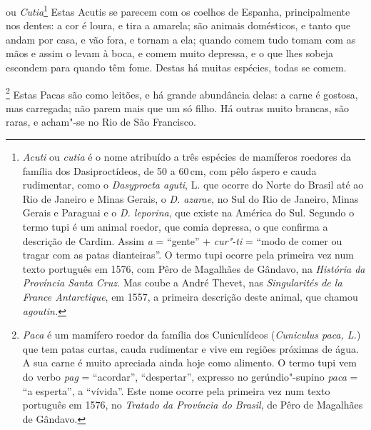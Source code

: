  ou \textit{Cutia}\footnote{ \textit{Acuti} ou
\textit{cutia} é o nome atribuído a três espécies de mamíferos
roedores da família dos Dasiproctídeos, de 50 a 60\,cm, com pêlo áspero e
cauda rudimentar, como o \textit{Dasyprocta aguti}, L. que ocorre do
Norte do Brasil até ao Rio de Janeiro e Minas Gerais, o \textit{D.
azarae}, no Sul do Rio de Janeiro, Minas Gerais e Paraguai e o
\textit{D. leporina}, que existe na América do Sul. Segundo o
termo tupi é um animal roedor, que comia depressa, o que confirma a
descrição de Cardim. Assim \textit{a} = ``gente'' + \textit{cur"-ti} = 
``modo de comer ou tragar com as patas dianteiras''. O termo tupi ocorre
pela primeira vez num texto português em 1576, com Pêro de Magalhães de
Gândavo, na \textit{História da Província Santa Cruz.} Mas coube a
André Thevet, nas \textit{Singularités de la France Antarctique}, em
1557, a primeira descrição deste animal, que chamou
\textit{agoutin.}} Estas Acutis se parecem com os coelhos de
Espanha, principalmente nos dentes: a cor é loura, e tira a amarela;
são animais domésticos, e tanto que andam por casa, e vão fora, e
tornam a ela; quando comem tudo tomam com as mãos e assim o levam à
boca, e comem muito depressa, e o que lhes sobeja escondem para quando
têm fome. Destas há muitas espécies, todas se comem. 

\footnote{ \textit{Paca} é um mamífero
roedor da família dos Cuniculídeos (\textit{Cuniculus paca, L.}) que
tem patas curtas, cauda rudimentar e vive em regiões próximas de água.
A sua carne é muito apreciada ainda hoje como alimento. O termo tupi
vem do verbo \textit{pag} = ``acordar'', ``despertar'', expresso no
gerúndio"-supino \textit{paca} = ``a esperta'', a ``vívida''. Este nome
ocorre pela primeira vez num texto português em 1576, no
\textit{Tratado da Província do Brasil}, de Pêro de Magalhães de Gândavo.}
Estas Pacas são como leitões, e há grande abundância delas:
a carne é gostosa, mas carregada; não parem mais que um só filho. Há
outras muito brancas, são raras, e acham"-se no Rio de São Francisco. 

